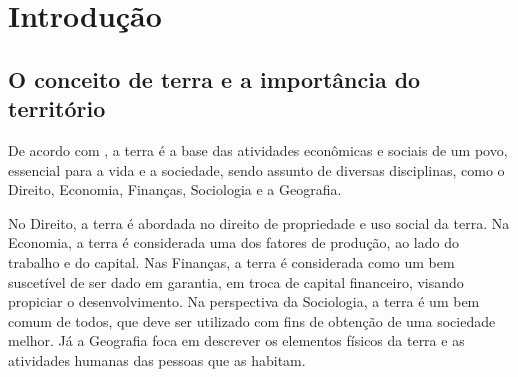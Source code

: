 \documentclass[
	12pt,				%
	oneside,			%
	a4paper,			%
	chapter=TITLE,		%
	section=TITLE,		%
	english,			%
	brazil				%
	]{abntex2}
\begin{document}
{%
	\hypersetup{hidelinks}
	\listoffigures*
	\cleardoublepage
	
	\listofquadros*
	\cleardoublepage
	
	\listoftables*
	\cleardoublepage
	
	\imprimirlistadesiglas
	
	\imprimirlistadesimbolos
	
	\tableofcontents*
	\cleardoublepage
	
}%


\textual

\hypertarget{intro}{%
\chapter{Introdução}\label{intro}}

\hypertarget{o-conceito-de-terra-e-a-importuxe2ncia-do-territuxf3rio}{%
\section{O conceito de terra e a importância do território}\label{o-conceito-de-terra-e-a-importuxe2ncia-do-territuxf3rio}}

De acordo com \textcite{realestate}, a terra é a base das atividades econômicas e sociais
de um povo, essencial para a vida e a sociedade, sendo assunto de diversas
disciplinas, como o Direito, Economia, Finanças, Sociologia e a Geografia.

No Direito, a terra é abordada no direito de propriedade e uso social da terra.
Na Economia, a terra é considerada uma dos fatores de produção, ao lado do
trabalho e do capital. Nas Finanças, a terra é considerada como um bem
suscetível de ser dado em garantia, em troca de capital financeiro, visando
propiciar o desenvolvimento. Na perspectiva da Sociologia, a terra é um bem
comum de todos, que deve ser utilizado com fins de obtenção de uma sociedade
melhor. Já a Geografia foca em descrever os elementos físicos da terra e as
atividades humanas das pessoas que as habitam.
\end{document}
